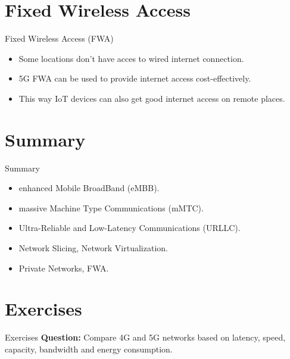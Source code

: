 \documentclass{beamer}
\begin{document}
\section[Fixed Wireless Access]{Fixed Wireless Access}


\begin{frame}{Fixed Wireless Access (FWA)}
  \vspace*{1.6em}
  \begin{itemize}
    \item Some locations don't have acces to wired internet connection.
    \vspace*{0.75em}
    \item 5G FWA can be used to provide internet access cost-effectively.
    \vspace*{0.75em}
    \item This way IoT devices can also get good internet access on remote places.
  \end{itemize}
\end{frame}


\section[Summary]{Summary}


\begin{frame}{Summary}
  \begin{itemize}
    \item enhanced Mobile BroadBand (eMBB).
    \vspace*{0.75em}
    \item massive Machine Type Communications (mMTC).
    \vspace*{0.75em}
    \item Ultra-Reliable and Low-Latency Communications (URLLC).
    \vspace*{0.75em}
    \item Network Slicing, Network Virtualization.
    \vspace*{0.75em}
    \item Private Networks, FWA.
  \end{itemize}
\end{frame}



\section[Exercises]{Exercises}


\begin{frame}{Exercises}
  \textbf{Question:} Compare 4G and 5G networks based on latency, speed, capacity, bandwidth and energy consumption.
\end{frame}
\end{document}

